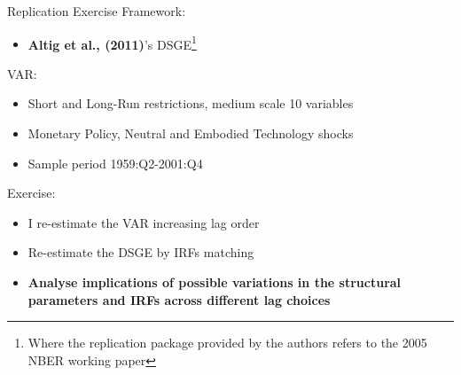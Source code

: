 \documentclass[11pt]{beamer}
\begin{document}
\begin{frame}{Replication Exercise}
    Framework:
    \begin{itemize}
        \item \textbf{Altig et al., (2011)}'s DSGE\footnote{Where the replication package provided by the authors refers to the 2005 NBER working paper}
    \end{itemize}

    VAR:
    \begin{itemize}
        \item Short and Long-Run restrictions, medium scale 10 variables
        \item Monetary Policy, Neutral and Embodied Technology shocks
        \item Sample period 1959:Q2-2001:Q4
    \end{itemize}
    
    Exercise:
    \begin{itemize}
        \item I re-estimate the VAR increasing lag order
        \item Re-estimate the DSGE by IRFs matching
        \vspace{0.2cm}

        \item \textbf{\textcolor{PadovaRed}{Analyse implications of possible variations in the structural parameters and IRFs across different lag choices}}
    \end{itemize}
\end{frame}
\end{document}
